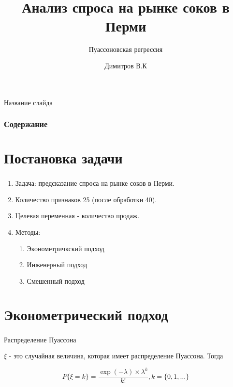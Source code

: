 \documentclass[unicode]{beamer}
\title[Анализ спроса]{Анализ спроса на рынке соков в Перми}
\author{Димитров В.К}
\institute[НГУ]{Новосибирский Государственный университет}
\begin{document}
	
\begin{frame}{Название слайда}
	\titlepage


\end{frame}

	\begin{frame}
	\frametitle{Содержание}
	
	\tableofcontents [pausesections]
	
	
\end{frame}


\section{Постановка задачи}
\begin{frame}
	\frametitle{\insertsection}
	
	\begin{enumerate}
		\item 
		Задача: предсказание спроса на рынке соков в Перми.
		\item 
		Количество признаков 25  (после обработки 40).
		\item
		Целевая переменная - количество продаж.
		
		\item 
		Методы: 
		\begin{enumerate}
			\item Эконометричкский подход
			
			\item Инженерный подход
			
			\item Смешенный подход
		\end{enumerate}
	\end{enumerate}
\end{frame}
\section{Эконометрический подход}
\subtitle{Пуассоновская регрессия}

\begin{frame}
	\frametitle{\insertsection}
	
	\framesubtitle{\insertsubtitle}
	
	\begin{block}{Распределение Пуассона}
		
		$\xi$ - это случайная величина, которая имеет распределение Пуассона. Тогда		
		
		
		\[P\{\xi = k\} = \dfrac{\exp(-\lambda)\times \lambda^k}{k!}, k = \{0, 1, \ldots \}\]
		
	\end{block}	
\end{frame}
\end{document}
